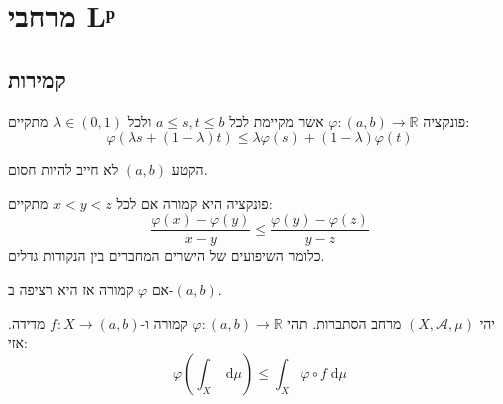 \documentclass{tstextbook}
\begin{document}
\section{מרחבי Lᵖ}

\subsection{קמירות}

\begin{definition}
פונקציה \(\varphi:(a,b)\to \mathbb{R}\) אשר מקיימת לכל \(a\leq s,t \leq b\) ולכל \(\lambda \in (0,1)\) מתקיים:
$$\varphi\left( \lambda s+\left( 1-\lambda \right)t \right)\leq \lambda \varphi(s)+\left( 1-\lambda \right)\varphi(t)$$

\end{definition}
\begin{remark}
הקטע \((a,b)\) לא חייב להיות חסום.

\end{remark}
\begin{proposition}
פונקציה היא קמורה אם לכל \(x<y<z\) מתקיים:
$$\frac{\varphi(x)-\varphi(y)}{x-y}\leq \frac{\varphi(y)-\varphi(z)}{y-z}$$
כלומר השיפועים של הישרים המחברים בין הנקודות גדלים.

\end{proposition}
\begin{lemma}
אם \(\varphi\) קמורה אז היא רציפה ב-\((a,b)\).

\end{lemma}
\begin{theorem}
יהי \(\left( X,\mathcal{A},\mu \right)\) מרחב הסתברות. תהי \(\varphi:(a,b)\to \mathbb{R}\) קמורה ו-\(f:X\to (a,b)\) מדידה. אזי:
$$\varphi\left( \int _{X} \;\mathrm{d} \mu  \right)\leq \int _{X} \varphi \circ  f \;\mathrm{d} \mu $$

\end{theorem}
\end{document}
